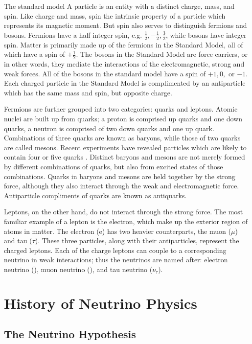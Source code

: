 The standard model A particle is an entity with a distinct charge, mass, and
spin.  Like charge and mass, spin the intrinsic property of a particle which
represents its magnetic moment.  But spin also serves to distinguish fermions
and bosons. Fermions have a half integer spin, e.g. $\frac{1}{2}, -\frac{1}{2},
\frac{3}{2}$, while bosons have integer spin.  Matter is primarily made up of
the fermions in the Standard Model, all of which have a spin of
$\pm \frac{1}{2}$.
The bosons in the Standard Model are force carriers, or in other words, they
mediate the interactions of the electromagnetic, strong and weak forces.  All
of the bosons in the standard model have a spin of $+1, 0, $ or $ -1$.  Each
charged particle in the Standard Model is complimented by an antiparticle which
has the same mass and spin, but opposite charge. \cite{halzen1984quarks}

Fermions are further grouped into two categories: quarks and leptons.  Atomic
nuclei are built up from quarks; a proton is comprised up quarks and one down
quarks, a neutron is comprised of two down quarks and one up quark.
Combinations of three quarks are known as baryons, while those of two quarks
are called mesons.  Recent experiments have revealed particles which are likely
to contain four or five quarks \cite{dias2013z_,barth2003evidence}.  Distinct
baryons and mesons are not merely formed by different combinations of quarks,
but also from excited states of those combinations.  Quarks in baryons and
mesons are held together by the strong force, although they also interact
through the weak and electromagnetic force.  Antiparticle compliments of quarks
are known as antiquarks.  \cite{halzen1984quarks}

Leptons, on the other hand, do not interact through the strong force.  The most
familiar example of a lepton is the electron, which make up the exterior region
of atoms in matter.  The electron (e) has two heavier counterparts, the muon
($\mu$) and tau ($\tau$).  These three particles, along with their
antiparticles, represent the charged leptons.  Each of the charge leptons can
couple to a corresponding neutrino in weak interactions; thus the neutrinos are
named after: electron neutrino (\nue), muon neutrino (\numu), and tau neutrino
($\nu_\tau$).

\section{History of Neutrino Physics}

\subsection{The Neutrino Hypothesis}

